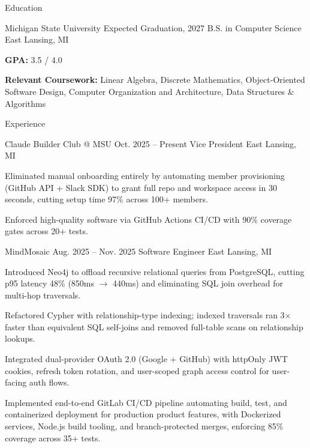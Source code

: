 \documentclass[
	11pt
]{../../../resume}
\begin{document}
	\begin{rSection}{E}{ducation}
		\begin{rSectionEntry}
			{Michigan State University}
			{Expected Graduation, 2027}
			{B.S. in Computer Science}
			{}
			{East Lansing, MI}

			\item \textbf{GPA:} 3.5 / 4.0
			\item \textbf{Relevant Coursework:} Linear Algebra, Discrete Mathematics, Object-Oriented Software Design, Computer Organization and Architecture, Data Structures \& Algorithms
		\end{rSectionEntry}
	\end{rSection}

	\begin{rSection}{E}{xperience}
		\begin{rSectionEntry}
			{Claude Builder Club @ MSU}
			{Oct. 2025 -- Present}
			{Vice President}
			{}
			{East Lansing, MI}

			\item Eliminated manual onboarding entirely by automating member provisioning (GitHub API + Slack SDK) to grant full repo and workspace access in 30 seconds, cutting setup time 97\% across 100+ members.
			\item Enforced high-quality software via GitHub Actions CI/CD with 90\% coverage gates across 20+ tests.
		\end{rSectionEntry}

		\begin{rSectionEntry}
			{MindMosaic}
			{Aug. 2025 -- Nov. 2025}
			{Software Engineer}
			{}
			{East Lansing, MI}

			\item Introduced Neo4j to offload recursive relational queries from PostgreSQL, cutting p95 latency 48\% (850ms $\rightarrow$ 440ms) and eliminating SQL join overhead for multi-hop traversals.
			\item Refactored Cypher with relationship-type indexing; indexed traversals ran 3$\times$ faster than equivalent SQL self-joins and removed full-table scans on relationship lookups.
			\item Integrated dual-provider OAuth 2.0 (Google + GitHub) with httpOnly JWT cookies, refresh token rotation, and user-scoped graph access control for user-facing auth flows.
			\item Implemented end-to-end GitLab CI/CD pipeline automating build, test, and containerized deployment for production product features, with Dockerized services, Node.js build tooling, and branch-protected merges, enforcing 85\% coverage across 35+ tests.
		\end{rSectionEntry}
	\end{rSection}
\end{document}
